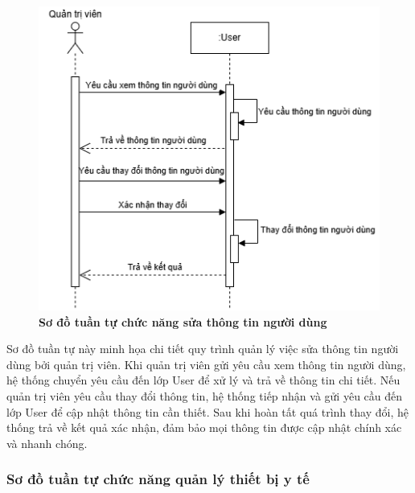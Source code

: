 \begin{figure}[H]
	\centering
	\includegraphics[width=12cm,height=10cm]{Images/sequence/user/update.drawio.png}
	\caption[Sơ đồ tuần tự chức năng sửa thông tin người dùng]{\bfseries \fontsize{12pt}{0pt}
		\selectfont Sơ đồ tuần tự chức năng sửa thông tin người dùng}
	\label{sequence_update_user} %
\end{figure}
Sơ đồ tuần tự này minh họa chi tiết quy trình quản lý việc sửa thông tin người dùng bởi quản trị viên. Khi quản trị viên gửi yêu cầu xem thông tin người dùng, hệ thống chuyển yêu cầu đến lớp User để xử lý và trả về thông tin chi tiết.
Nếu quản trị viên yêu cầu thay đổi thông tin, hệ thống tiếp nhận và gửi yêu cầu đến lớp User để cập nhật thông tin cần thiết. Sau khi hoàn tất quá trình thay đổi, hệ thống trả về kết quả xác nhận, đảm bảo mọi thông tin được cập nhật chính xác và nhanh chóng.


\subsubsection{Sơ đồ tuần tự chức năng quản lý thiết bị y tế}

